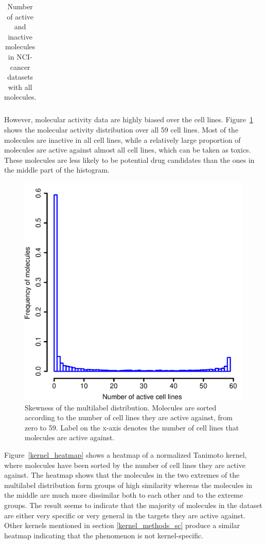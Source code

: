 \documentclass[english]{tktltiki}
\begin{document}
\begin{center}
\begin{table}
\begin{tabular}{|c|c|c||c|c|c|}
\end{tabular}
\caption[NCI-cancer dataset with full data.]{Number of active and inactive molecules in NCI-cancer datasets with all molecules.}
\label{cancer_statistics}
\end{table}
\end{center}

However, molecular activity data are highly biased over the cell lines. Figure~\ref{activity_hist} shows the molecular activity distribution over all 59 cell lines. Most of the molecules are inactive in all cell lines, while a relatively large proportion of molecules are active against almost all cell lines, which can be taken as toxics. These molecules are less likely to be potential drug candidates than the ones in the middle part of the histogram. 

\begin{figure}[t]
\begin{center}
\centering
\includegraphics[width=0.60\columnwidth]{./plots/activity_hist.pdf}
\caption[Skewness of multilabel distribution.]{Skewness of the multilabel distribution. Molecules are sorted according to the number of cell lines they are active against, from zero to 59. Label on the x-axis denotes the number of cell lines that molecules are active against.}
\label{activity_hist}
\end{center}
\end{figure}

Figure~\ref{kernel_heatmap} shows a heatmap of a normalized Tanimoto kernel, where molecules have been sorted by the number of cell lines they are active against. The heatmap shows that the molecules in the two extremes of the multilabel distribution form groups of high similarity whereas the molecules in the middle are much more dissimilar both to each other and to the extreme groups. The result seems to indicate that the majority of molecules in the dataset are either very specific or very general in the targets they are active against.  Other kernels mentioned in section \ref{kernel_methods_sc} produce a similar heatmap indicating that the phenomenon is not kernel-specific.
\end{document}
